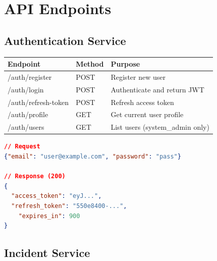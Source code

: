 \documentclass[12pt,a4paper]{report}
\begin{document}
\newpage

\chapter{API Endpoints}

\section{Authentication Service}

\begin{table}[H]
\centering\small
\begin{tabular}{|l|l|p{7cm}|}
\hline
\textbf{Endpoint} & \textbf{Method} & \textbf{Purpose} \\
\hline
/auth/register & POST & Register new user \\
\hline
/auth/login & POST & Authenticate and return JWT \\
\hline
/auth/refresh-token & POST & Refresh access token \\
\hline
/auth/profile & GET & Get current user profile \\
\hline
/auth/users & GET & List users (system\_admin only) \\
\hline
\end{tabular}
\end{table}

\begin{lstlisting}[language=JSON, caption=Login Request/Response]
// Request
{"email": "user@example.com", "password": "pass"}

// Response (200)
{
  "access_token": "eyJ...",
  "refresh_token": "550e8400-...",
	"expires_in": 900
}
\end{lstlisting}

\newpage
\section{Incident Service}
\end{document}
